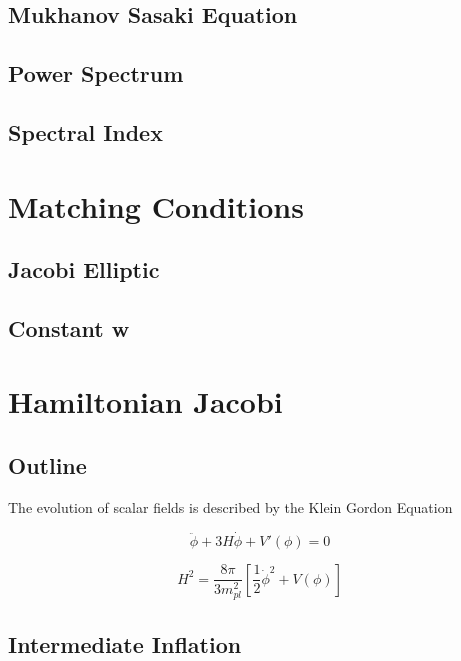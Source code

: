 \documentclass[12pt]{article} %
\begin{document}
\subsection{Mukhanov Sasaki Equation}

\subsection{Power Spectrum}

\subsection{Spectral Index}

\section{Matching Conditions}

\subsection{Jacobi Elliptic}

\subsection{Constant w}

\section{Hamiltonian Jacobi}

\subsection{Outline}

The evolution of scalar fields is described by the Klein \cite{goldstein} Gordon Equation

\begin{equation}
\ddot{\phi} + 3H\dot{\phi}+V'(\phi)=0
\end{equation}

\begin{equation}
H^{2}=\frac{8\pi}{3 m_{pl}^{2}}[\frac{1}{2}\dot{\phi}^{2}+V(\phi)]
\end{equation}

\subsection{Intermediate Inflation}
\end{document}
